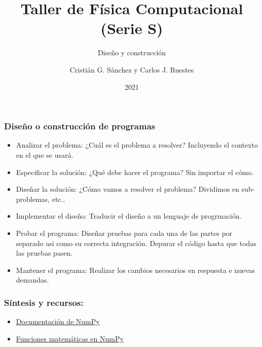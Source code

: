 \documentclass{beamer}
\title{Taller de Física Computacional (Serie S)}
\subtitle{Diseño y construcción}
\author{Cristián G. Sánchez y Carlos J. Ruestes}
\date{2021}
\begin{document}
\frame{\titlepage}

\begin{frame}[fragile]
    \frametitle{Diseño o construcción de programas}
    \begin{itemize}
        \item Analizar el problema: ¿Cuál es el problema a resolver? Incluyendo el contexto en el que se usará.
        \item Especificar la solución: ¿Qué debe hacer el programa? Sin importar el cómo.
        \item Diseñar la solución: ¿Cómo vamos a resolver el problema? Dividimos en sub-problemas, etc..
        \item Implementar el diseño: Traducir el diseño a un lenguaje de progrmación.
        \item Probar el programa: Diseñar pruebas para cada una de las partes por separado asi como su correcta integración.
        Depurar el código hasta que todas las pruebas pasen.
        \item Mantener el programa: Realizar los cambios necesarios en respuesta e nuevas demandas.
    \end{itemize}
\end{frame}



\begin{frame}
\frametitle{Síntesis y recursos:}

\begin{itemize}
\item \href{https://numpy.org/doc/stable/}{Documentación de NumPy}
\item \href{https://numpy.org/doc/stable/reference/routines.math.html}{Funciones matemáticas en NumPy}

\end{itemize}
\end{frame}
\end{document}
